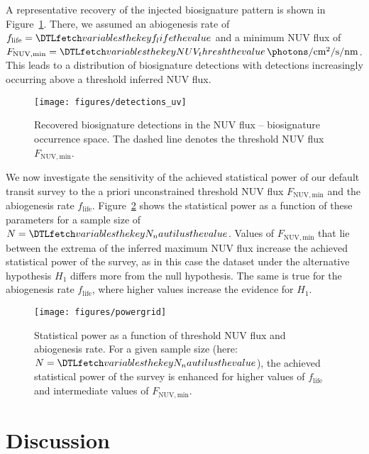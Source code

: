 \documentclass[modern,linenumbers]{aastex631}
\begin{document}
A representative recovery of the injected biosignature pattern is shown in Figure~\ref{fig:detections_uv}.
There, we assumed an abiogenesis rate of $f_\mathrm{life} = \var{f_life}$ and a minimum \gls{NUV} flux of $F_\mathrm{NUV, min} = \var{NUV_thresh}\,\SI{}{\photons\per\centi\meter\squared\per\second\per\nano\meter}$.
This leads to a distribution of biosignature detections with detections increasingly occurring above a threshold inferred NUV flux.
\begin{figure}
    \begin{centering}
        \texttt{[image: figures/detections\_uv]}
        \caption{Recovered biosignature detections in the \gls{NUV} flux -- biosignature occurrence space. The dashed line denotes the threshold \gls{NUV} flux $F_\mathrm{NUV, min}$.}
        \label{fig:detections_uv}
    \end{centering}
\end{figure}


We now investigate the sensitivity of the achieved statistical power of our default transit survey to the a priori unconstrained threshold \gls{NUV} flux $F_\mathrm{NUV, min}$ and the abiogenesis rate $f_\mathrm{life}$.
Figure~\ref{fig:powergrid} shows the statistical power as a function of these parameters for a sample size of $N=\var{N_nautilus}$.
Values of $F_\mathrm{NUV, min}$ that lie between the extrema of the inferred maximum \gls{NUV} flux increase the achieved statistical power of the survey, as in this case the dataset under the alternative hypothesis $H_1$ differs more from the null hypothesis.
The same is true for the abiogenesis rate $f_\mathrm{life}$, where higher values increase the evidence for $H_1$.

\begin{figure}
    \begin{centering}
        \texttt{[image: figures/powergrid]}
        \caption{Statistical power as a function of threshold \gls{NUV} flux and abiogenesis rate. For a given sample size (here: $N=\var{N_nautilus}$), the achieved statistical power of the survey is enhanced for higher values of $f_\mathrm{life}$ and intermediate values of $F_\mathrm{NUV, min}$.}
        \label{fig:powergrid}
    \end{centering}
\end{figure}



\section{Discussion}
\label{sec:discussion}
\end{document}
